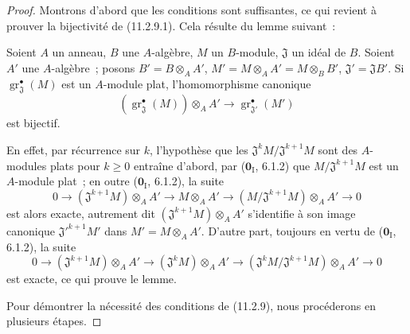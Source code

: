 \begin{proof}
Montrons d'abord que les conditions sont suffisantes, ce qui revient à prouver
la bijectivité de (11.2.9.1). Cela résulte du lemme suivant~:

\begin{lemma}[11.2.9.2]
\label{IV.11.2.9.2-fr}
Soient $A$ un anneau, $B$ une $A$-algèbre, $M$ un $B$-module, $\mathfrak J$ un
idéal de $B$. Soient $A'$ une $A$-algèbre~; posons
$B'=B\otimes_AA'$, $M'=M\otimes_AA'=M\otimes_BB'$,
$\mathfrak J'=\mathfrak JB'$. Si
$\operatorname{gr}_{\mathfrak J}^\bullet(M)$ est un $A$-module plat,
l'homomorphisme canonique
\[
(\operatorname{gr}_{\mathfrak J}^\bullet(M))\otimes_AA'
\longrightarrow \operatorname{gr}_{\mathfrak J'}^\bullet(M')
\]
est bijectif.
\end{lemma}

En effet, par récurrence sur $k$, l'hypothèse que les
$\mathfrak J^kM/\mathfrak J^{k+1}M$ sont des $A$-modules plats pour $k\geq0$
entraîne d'abord, par ($\mathbf 0_{\mathrm I}$, 6.1.2) que
$M/\mathfrak J^{k+1}M$ est un $A$-module plat~; en outre
($\mathbf 0_{\mathrm I}$, 6.1.2), la suite
\[
0\longrightarrow(\mathfrak J^{k+1}M)\otimes_AA'
\longrightarrow M\otimes_AA'
\longrightarrow(M/\mathfrak J^{k+1}M)\otimes_AA'\longrightarrow0
\]
est alors exacte, autrement dit $(\mathfrak J^{k+1}M)\otimes_AA'$ s'identifie
à son image canonique $\mathfrak J'^{k+1}M'$ dans $M'=M\otimes_AA'$.
D'autre part, toujours en vertu de ($\mathbf 0_{\mathrm I}$, 6.1.2), la suite
\[
0\longrightarrow(\mathfrak J^{k+1}M)\otimes_AA'
\longrightarrow(\mathfrak J^kM)\otimes_AA'
\longrightarrow(\mathfrak J^kM/\mathfrak J^{k+1}M)\otimes_AA'
\longrightarrow0
\]
est exacte, ce qui prouve le lemme.

Pour démontrer la nécessité des conditions de (11.2.9), nous procéderons en
plusieurs étapes.


\end{proof}
